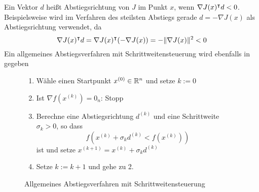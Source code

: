 

 Ein Vektor $d$ heißt Abstiegsrichtung von $J$ im Punkt $x$, wenn $\nabla J(x)^\intercal d<0$. Beispielsweise wird im Verfahren des steilsten Abstiegs gerade $d=- \nabla J(x)$ als Abstiegsrichtung verwendet, da 
\[
\nabla J(x)^\intercal d = \nabla J(x)^\intercal (-\nabla J(x)) = - \|\nabla J(x)\|^2 <0                                                                                                                                                                                                                                                                        \]
Ein allgemeines Abstiegsverfahren mit Schrittweitensteuerung wird ebenfalls in \cite[S. 69, Verfahren 4.1.4]{alt2002nichtlineare} gegeben
\begin{figure}[H]
\begin{framed}
 \begin{enumerate}
  \item Wähle einen Startpunkt $x^{(0)}\in \mathbb{R}^n$ und setze $k:=0$
  \item Ist $\nabla f(x^{(k)})=0_n$: Stopp
  \item Berechne eine Abstiegsrichtung $d^{(k)}$ und eine Schrittweite $\sigma_k>0$, so dass
  \[
   f(x^{(k)} + \sigma_k d^{(k)} < f(x^{(k)}))
  \]
  ist und setze $x^{(k+1)} = x^{(k)}+\sigma_k d^{(k)}$
  \item Setze $k:=k+1$ und gehe zu 2.
 \end{enumerate}
\end{framed}
\caption{Allgemeines Abstiegsverfahren mit Schrittweitensteuerung}
\label{alg:genSteepestDescent}
\end{figure}

